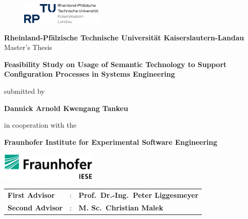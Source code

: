 \begin{titlepage}

    \begin{center}

        \begin{figure}
            \centering
            \includegraphics[width=0.35\textwidth]{images/RPTU-Logo.png}
        \end{figure}
        
        \textbf{Rheinland-Pfälzische Technische Universität Kaiserslautern-Landau}\\[2\baselineskip]

        Master's Thesis

        \vspace{0.8cm}

        \Huge
        \textbf{Feasibility Study on Usage of Semantic Technology to Support Configuration Processes in Systems Engineering}
        \vspace{1.5cm}

        \normalsize
        submitted by

        \large
        \textbf{Dannick Arnold Kwengang Tankeu}


        \vspace{1.5cm}

        \normalsize
        in cooperation with the

        \vspace{0.8cm}

        \textbf{Fraunhofer Institute for Experimental Software Engineering}

        \vspace{1.0cm}

        \includegraphics[width=0.35\textwidth]{images/logo_iese}

        \vspace{1.0cm}

        \large
        \begin{tabular}{l l l}
            \textbf{First Advisor}  &: & \textbf{Prof.~Dr.-Ing.~Peter Liggesmeyer} \\
            \textbf{Second Advisor} &: & \textbf{M. Sc.~Christian Malek} \\
        \end{tabular}

    \end{center}
\end{titlepage}
